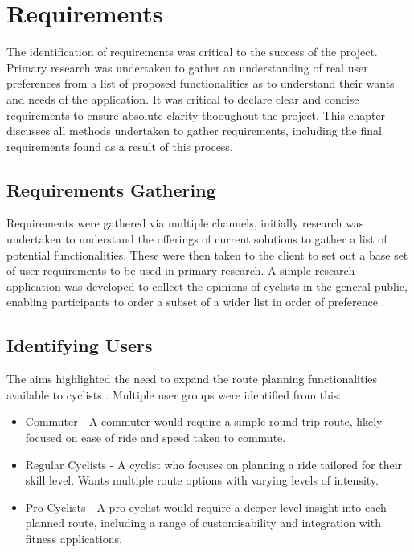 \chapter{Requirements}
\label{chap:requirements}

The identification of requirements was critical to the success of the project. Primary research was undertaken to gather an understanding of real user preferences from a list of proposed functionalities as to understand their wants and needs of the application. It was critical to declare clear and concise requirements to ensure absolute clarity thooughout the project. This chapter discusses all methods undertaken to gather requirements, including the final requirements found as a result of this process.

\section{Requirements Gathering}
\label{requirements:gathering}

Requirements were gathered via multiple channels, initially research was undertaken to understand the offerings of current solutions to gather a list of potential functionalities. These were then taken to the client to set out a base set of user requirements to be used in primary research. A simple research application was developed to collect the opinions of cyclists in the general public, enabling participants to order a subset of a wider list in order of preference .

\section{Identifying Users}
\label{requirements:identifyingusers}

The aims highlighted the need to expand the route planning functionalities available to cyclists . Multiple user groups were identified from this:
\begin{itemize}
  \item Commuter - A commuter would require a simple round trip route, likely focused on ease of ride and speed taken to commute.
  \item Regular Cyclists - A cyclist who focuses on planning a ride tailored for their skill level. Wants multiple route options with varying levels of intensity.
  \item Pro Cyclists - A pro cyclist would require a deeper level insight into each planned route, including a range of customisability and integration with fitness applications.
\end{itemize}


